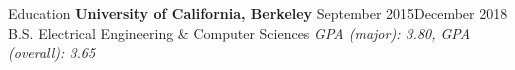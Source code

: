 \documentclass{resume} %
\begin{document}




\begin{rSection}{Education}
{\bf University of California, Berkeley} \hfill {September 2015\textminus  December 2018} \\ 
B.S. Electrical Engineering \& Computer Sciences \hfill {\em GPA (major): 3.80, GPA (overall): 3.65}
\end{rSection}

\end{document}
